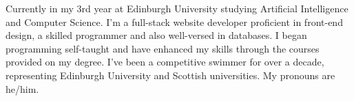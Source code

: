 

\begin{cvparagraph}

    Currently in my 3rd year at Edinburgh University studying Artificial Intelligence and Computer Science. I'm a full-stack website developer proficient in front-end design, a skilled programmer and also well-versed in databases. I began programming self-taught and have enhanced my skills through the courses provided on my degree. I've been a competitive swimmer for over a decade, representing Edinburgh University and Scottish universities. My pronouns are he/him.

\end{cvparagraph}


